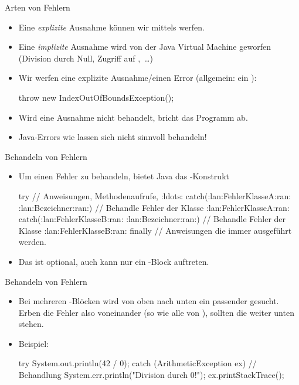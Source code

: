 \begin{frame}[fragile]{Arten von Fehlern}
    \begin{itemize}[<+(1)->]
        \widei
        \item Eine \emph{explizite} Ausnahme können wir mittels  werfen.
        \item Eine \emph{implizite} Ausnahme wird von der Java Virtual Machine geworfen\pause{} (Division durch Null, Zugriff auf ,~\ldots)
        \item Wir werfen eine explizite Ausnahme/einen Error (allgemein: ein ): \pause{}
\begin{plainjava}
throw new IndexOutOfBoundsException();
\end{plainjava}
        \item Wird eine Ausnahme nicht behandelt,\pause{} bricht das Programm ab.
        \item Java-Errors wie   lassen sich nicht sinnvoll behandeln!
    \end{itemize}
\end{frame}

\begin{frame}[fragile]{Behandeln von Fehlern}
    \begin{itemize}[<+(1)->]
        \widei
        \item Um einen Fehler zu behandeln, bietet Java das -Konstrukt
\begin{plainjava}
try {
    // Anweisungen, Methodenaufrufe, :ldots:
} catch(:lan:FehlerKlasseA:ran: :lan:Bezeichner:ran:) {
    // Behandle Fehler der Klasse :lan:FehlerKlasseA:ran:
} catch(:lan:FehlerKlasseB:ran: :lan:Bezeichner:ran:) {
    // Behandle Fehler der Klasse :lan:FehlerKlasseB:ran:
} finally {
    // Anweisungen die immer ausgeführt werden.
}
\end{plainjava}
        \item Das  ist optional, auch kann nur ein -Block auftreten.
    \end{itemize}
\end{frame}


\begin{frame}[fragile]{Behandeln von Fehlern}
    \begin{itemize}[<+(1)->]
        \widei
        \item Bei mehreren -Blöcken wird von oben nach unten ein passender gesucht.\pause{} Erben die Fehler also voneinander (so wie alle von ),\pause{} sollten die  weiter unten stehen.
        \item Beispiel:\pause{}
\begin{plainjava}
try {
    System.out.println(42 / 0);
} catch (ArithmeticException ex) {
    // Behandlung
    System.err.println("Division durch 0!");
    ex.printStackTrace();
}
\end{plainjava}
    \end{itemize}
\end{frame}


